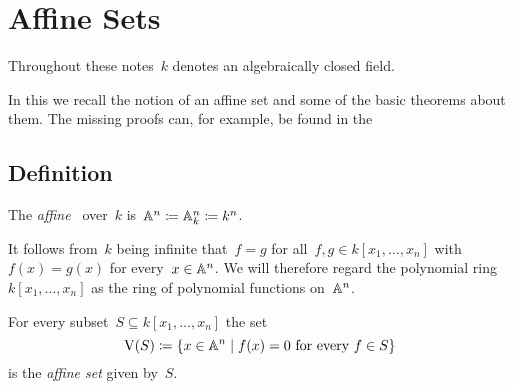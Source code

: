 \section{Affine Sets}
\label{affine sets}


\begin{conventions}
  Throughout these notes~$k$ denotes an algebraically closed field.
\end{conventions}


\begin{fluff}
  In this  we recall the notion of an affine set and some of the basic theorems about them.
  The missing proofs can, for example, be found in the \cite{algebra1notes}
\end{fluff}





\subsection{Definition}


\begin{definition}
  The \emph{affine~} over~$k$ is~$\mathbb{A}^n \coloneqq \mathbb{A}^n_k \coloneqq k^n$.
\end{definition}


\begin{fluff}
  It follows from~$k$ being infinite that~$f = g$ for all~$f, g \in k[x_1, \dotsc, x_n]$ with~$f(x) = g(x)$ for every~$x \in \mathbb{A}^n$.
  We will therefore regard the polynomial ring~$k[x_1, \dotsc, x_n]$ as the ring of polynomial functions on~$\mathbb{A}^n$.
\end{fluff}


\begin{definition}
  \label{definition of affine sets}
  For every subset~$S \subseteq k[x_1, \dotsc, x_n]$ the set
  \[
              \vset(S)
    \defined  \{
                x \in \Aff^n
              \suchthat
                \text{$f(x) = 0$ for every~$f \in S$}
              \}
  \]
  is the \emph{affine set} given by~$S$.
\end{definition}


